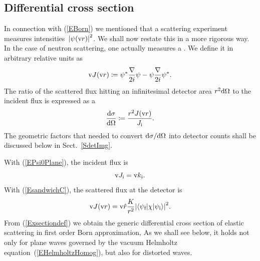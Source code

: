 %


\subsection{Differential cross section}\label{SdiffCross}

In connection with (\ref{EBorn}) we mentioned
that a scattering experiment measures intensities~${|\psi(\text{v}{r})|}^2$.
We shall now restate this in a more rigorous way.
In the case of neutron scattering,
one actually measures a .
We define it in arbitrary relative units as
\begin{equation}\label{EdefJ}
  \text{v}{J}(\text{v}{r}) \coloneqq  \psi^*\frac{\mathbf{\nabla}}{2i}\psi - \psi\frac{\mathbf{\nabla}}{2i}\psi^*.
\end{equation}
%
The ratio of the scattered flux hitting an infinitesimal detector area
$r^2\text{d}\Omega$ to the incident flux is expressed as a
%
\begin{equation}\label{Exsectiondef}
  \frac{\text{d}\sigma}{\text{d}\Omega}
  \coloneqq  \frac{r^2 J(\text{v}{r})}{J_{\text{i}}}.
\end{equation}
%
%
The geometric factors that needed to
convert $\text{d}\sigma/\text{d}\Omega$ into detector counts shall be discussed
below in Sect.~\ref{SdetImg}.

With (\ref{EPsi0Plane}), the incident flux is
\begin{equation}\label{EJi}
  \text{v}{J}_{\text{i}} = \text{v}{k}_{\text{i}}.
\end{equation}
With (\ref{EsandwichC}), the scattered flux at the detector is
\begin{equation}\label{EJr}
  \text{v}{J}(\text{v}{r})
  = \text{v}{\hat r}\frac{K}{r^2}
    {\left|\left\langle\psi_{\text{f}}|\chi|\psi_{\text{i}}\right\rangle\right|}^2.
\end{equation}
From (\ref{Exsectiondef}) we obtain 
the generic differential cross section of elastic scattering in first order Born approximation,
As we shall see below,
it holds not only for plane waves governed
by the vacuum Helmholtz equation~(\ref{EHelmholtzHomog}),
but also for distorted waves.


